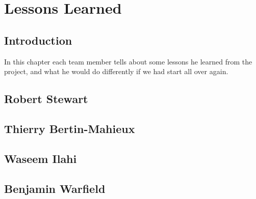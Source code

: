 
\chapter{Lessons Learned}


\section{Introduction}
In this chapter each team member tells about some lessons he learned from
the project, and what he would do differently if we had start all over
again.


\section{Robert Stewart}


\section{Thierry Bertin-Mahieux}


\section{Waseem Ilahi}


\section{Benjamin Warfield}


